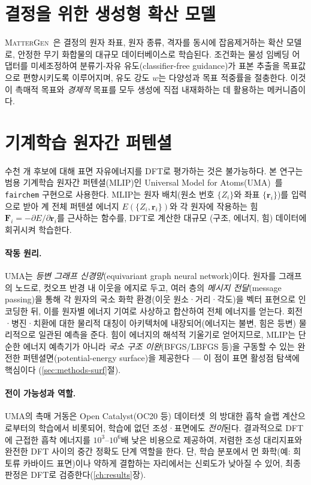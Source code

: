 \documentclass[11pt,a4paper]{report}
\begin{document}
\section{결정을 위한 생성형 확산 모델}
\textsc{MatterGen}~\cite{zeni2025}은 결정의 원자 좌표, 원자 종류, 격자를 동시에 잡음제거하는
확산 모델로, 안정한 무기 화합물의 대규모 데이터베이스로 학습된다. 조건화는 물성 임베딩 어댑터를
미세조정하여 분류기-자유 유도(classifier-free guidance)가 표본 추출을 목표값으로 편향시키도록
이루어지며, 유도 강도 $w$는 다양성과 목표 적중률을 절충한다. 이것이 촉매적 목표와 \emph{경제적}
목표를 모두 생성에 직접 내재화하는 데 활용하는 메커니즘이다.

\section{기계학습 원자간 퍼텐셜}
\label{sec:mlip-theory}
수천 개 후보에 대해 표면 자유에너지를 DFT로 평가하는 것은 불가능하다. 본 연구는 범용 기계학습
원자간 퍼텐셜(MLIP)인 Universal Model for Atoms(UMA)~\cite{uma2025}를 \texttt{fairchem} 구현으로
사용한다. MLIP는 원자 배치(원소 번호 $\{Z_i\}$와 좌표 $\{\mathbf{r}_i\}$)를 입력으로 받아 계 전체
퍼텐셜 에너지 $E(\{Z_i,\mathbf{r}_i\})$와 각 원자에 작용하는 힘 $\mathbf{F}_i=-\partial E/\partial
\mathbf{r}_i$를 근사하는 함수를, DFT로 계산한 대규모 (구조, 에너지, 힘) 데이터에 회귀시켜 학습한다.

\paragraph{작동 원리.} UMA는 \emph{등변 그래프 신경망}(equivariant graph neural network)이다. 원자를
그래프의 노드로, 컷오프 반경 내 이웃을 에지로 두고, 여러 층의 \emph{메시지 전달}(message passing)을
통해 각 원자의 국소 화학 환경(이웃 원소·거리·각도)을 벡터 표현으로 인코딩한 뒤, 이를 원자별 에너지
기여로 사상하고 합산하여 전체 에너지를 얻는다. 회전·병진·치환에 대한 물리적 대칭이 아키텍처에
내장되어(에너지는 불변, 힘은 등변) 물리적으로 일관된 예측을 준다. 힘이 에너지의 해석적 기울기로
얻어지므로, MLIP는 단순한 에너지 예측기가 아니라 \emph{국소 구조 이완}(BFGS/LBFGS 등)을 구동할 수
있는 완전한 퍼텐셜면(potential-energy surface)을 제공한다 --- 이 점이 표면 활성점 탐색에 핵심이다
(\ref{sec:methods-surf}절).

\paragraph{전이 가능성과 역할.} UMA의 촉매 거동은 Open Catalyst(OC20 등) 데이터셋~\cite{chanussot2021}의
방대한 흡착 슬랩 계산으로부터의 학습에서 비롯되어, 학습에 없던 조성·표면에도 \emph{전이}된다. 결과적으로
DFT에 근접한 흡착 에너지를 $10^3$--$10^6$배 낮은 비용으로 제공하여, 저렴한 조성 대리지표와 완전한
DFT 사이의 중간 정확도 단계 역할을 한다. 단, 학습 분포에서 먼 화학(예: 희토류 카바이드 표면)이나
약하게 결합하는 자리에서는 신뢰도가 낮아질 수 있어, 최종 판정은 DFT로 검증한다(\ref{ch:results}장).
\end{document}
